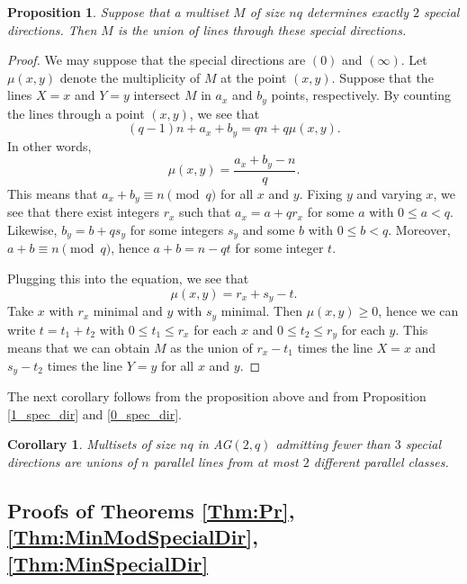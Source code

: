 \documentclass[12pt, a4paper]{article}
\newtheorem{crl}[thm]{Corollary}
\newtheorem{prop}[thm]{Proposition}
\theoremstyle{definition}
\begin{document}
\begin{prop}
\label{2_spec_dirs}
 Suppose that a multiset $M$ of size $nq$ determines exactly $2$ special directions. Then $M$ is the union of lines through these special directions.
\end{prop}

\begin{proof}
 We may suppose that the special directions are $(0)$ and $(\infty)$.
 Let $\mu(x,y)$ denote the multiplicity of $M$ at the point $(x,y)$.
 Suppose that the lines $X = x$ and $Y = y$ intersect $M$ in $a_x$ and $b_y$ points, respectively.
 By counting the lines through a point $(x,y)$, we see that
 \[
  (q-1) n + a_x + b_y = qn + q \mu(x,y).
 \]
 In other words,
 \[
  \mu(x,y) = \frac{a_x + b_y - n}{q}.
 \]
 This means that $a_x + b_y \equiv n \pmod{q}$ for all $x$ and $y$.
 Fixing $y$ and varying $x$, we see that there exist integers $r_x$ such that $a_x = a + q r_x$ for some $a$ with $0 \leq a < q$.
 Likewise, $b_y = b + q s_y$ for some integers $s_y$ and some $b$ with $0 \leq b < q$.
 Moreover, $a + b \equiv n \pmod q$, hence $a+b = n - qt$ for some integer $t$.

 Plugging this into the equation, we see that
 \[
  \mu(x,y) = r_x + s_y - t.
 \]
Take $x$ with $r_x$ minimal and $y$ with $s_y$ minimal.
Then $\mu(x,y) \geq 0$, hence we can write $t = t_1 + t_2$ with $0 \leq t_1 \leq r_x$ for each $x$ and $0 \leq t_2 \leq r_y$ for each $y$.
This means that we can obtain $M$ as the union of $r_x - t_1$ times the line $X = x$ and $s_y - t_2$ times the line $Y = y$ for all $x$ and $y$.
\end{proof}

The next corollary follows from the proposition above and from Proposition \ref{1_spec_dir} and \ref{0_spec_dir}.

\begin{crl}
Multisets of size $nq$ in AG$(2,q)$ admitting fewer than $3$ special directions are unions of $n$ parallel lines from at most $2$ different parallel classes.    
\end{crl}


\subsection{Proofs of Theorems \texorpdfstring{\ref{Thm:Pr}, \ref{Thm:MinModSpecialDir}, \ref{Thm:MinSpecialDir}}{}}
 \label{Sec:ProofsOfTheorems}
\end{document}
